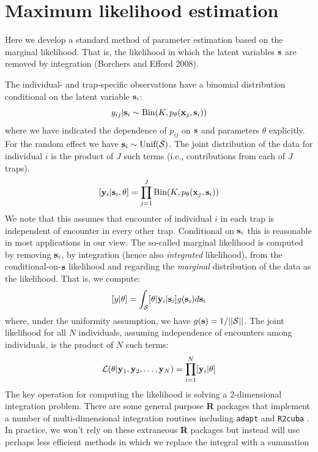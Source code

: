 \section{Maximum likelihood estimation}

Here we develop a standard method of parameter estimation based on
the marginal likelihood. That is, the likelihood in which the latent
variables ${\bf s}$ are removed by integration (Borchers and
Efford 2008). 

The individual- and trap-specific observations have a binomial
distribution conditional on the latent variable ${\bf s}_{i}$:
\begin{equation}
	y_{ij}| {\bf s}_{i} \sim \mbox{Bin}(K, p_{\theta}({\bf x}_{j},{\bf s}_{i}))
\label{mle.eq.cond-on-s}
\end{equation}
where we have indicated the dependence of $p_{ij}$ on ${\bf s}$ and
parameters $\theta$ explicitly.
For the random effect we have ${\bf s}_{i} \sim  \mbox{Unif}({\cal
  S})$.
The joint distribution of the data for individual $i$ is the product
of $J$ such terms (i.e., contributions from each of $J$ traps).
\[
  [{\bf y}_{i} | {\bf s}_{i} , \theta] = 
  \prod_{j=1}^{J} \mbox{Bin}(K, p_{\theta}({\bf x}_{j},{\bf s}_{i}) )
\]
We note that this assumes that encounter of individual $i$ in each
trap is independent of encounter in every other trap. Conditional on
${\bf s}_{i}$ this is reasonable in most applications in our view.
 The so-called marginal likelihood is computed by removing
${\bf s}_{i}$, by integration (hence also {\it integrated} likelihood), from the conditional-on-${\bf s}$
likelihood and regarding the {\it marginal} distribution of the data
as the likelihood. That
is, we compute:
\[
  [y|\theta] = 
\int_{{\cal S}}  [ \theta | {\bf y}_{i} |{\bf s}_{i}] g({\bf s}_{i}) d{\bf s}_{i}
\]
where, under the uniformity assumption, we have
$g({\bf s}) = 1/||{\cal S}||$.
The joint likelihood for all $N$ individuals, assuming independence of
encounters among individuals, is the product of $N$ such terms:
\[
{\cal L}(\theta | {\bf y}_{1},{\bf y}_{2},\ldots, {\bf y}_{N}) =     \prod_{i=1}^{N}
[{\bf y}_{i}|\theta]
\]
The key operation for computing the likelihood is solving a
2-dimensional integration problem. There are some general purpose {\bf
  R} packages that implement a number of 
 multi-dimensional integration routines
including \mbox{\tt adapt} \citep{genz_etal:2007} and \mbox{\tt R2cuba}
\citep{hahn_etal:2011}.  In practice, we won't rely
on these extraneous {\bf R} packages 
but instead will use perhaps less
efficient methods in which we replace the integral with a summation

